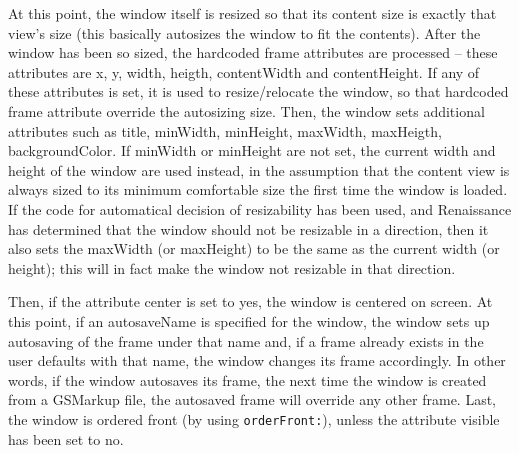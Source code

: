 At this point, the window itself is resized so that its content size
is exactly that view's size (this basically autosizes the window to
fit the contents).  After the window has been so sized, the hardcoded
frame attributes are processed -- these attributes are x, y, width,
heigth, contentWidth and contentHeight.  If any of these attributes is
set, it is used to resize/relocate the window, so that hardcoded frame
attribute override the autosizing size.  Then, the window sets
additional attributes such as title, minWidth, minHeight, maxWidth,
maxHeigth, backgroundColor.  If minWidth or minHeight are not set, the
current width and height of the window are used instead, in the
assumption that the content view is always sized to its minimum
comfortable size the first time the window is loaded.  If the code for
automatical decision of resizability has been used, and Renaissance
has determined that the window should not be resizable in a direction,
then it also sets the maxWidth (or maxHeight) to be the same as the
current width (or height); this will in fact make the window not
resizable in that direction.

Then, if the attribute center is set to yes, the window is centered on
screen.  At this point, if an autosaveName is specified for the
window, the window sets up autosaving of the frame under that name
and, if a frame already exists in the user defaults with that name,
the window changes its frame accordingly.  In other words, if the
window autosaves its frame, the next time the window is created from a
GSMarkup file, the autosaved frame will override any other frame.
Last, the window is ordered front (by using \texttt{orderFront:}),
unless the attribute visible has been set to no.

